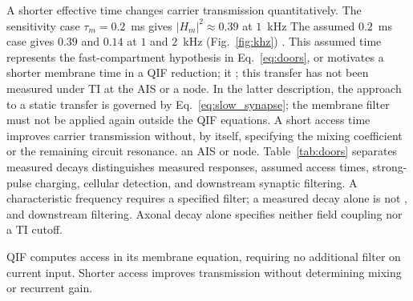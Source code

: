 \documentclass[11pt,a4paper]{article}
\providecommand{\DIFaddtex}[1]{{\protect\color{blue} \sf #1}} %
\providecommand{\DIFdeltex}[1]{{\protect\color{red} \scriptsize #1}} %
\providecommand{\DIFaddbegin}{} %
\providecommand{\DIFaddend}{} %
\providecommand{\DIFdelbegin}{} %
\providecommand{\DIFdelend}{} %
\providecommand{\DIFadd}[1]{\texorpdfstring{\DIFaddtex{#1}}{#1}} %
\providecommand{\DIFdel}[1]{\texorpdfstring{\DIFdeltex{#1}}{}} %
\begin{document}
\DIFdel{A shorter effective time changes carrier transmission quantitatively. The sensitivity
case $\tau_m=0.2$~ms gives $|H_m|^2\approx0.39$ at $1$~kHz }\DIFdelend \DIFaddbegin \DIFadd{The assumed $0.2$~ms case gives $0.39$ }\DIFaddend and $0.14$ at \DIFaddbegin \DIFadd{$1$ and }\DIFaddend $2$~kHz
(Fig.~\ref{fig:khz})\DIFdelbegin \DIFdel{. This assumed time represents the fast-compartment hypothesis
in Eq.~\eqref{eq:doors}, or motivates a shorter membrane time in a QIF reduction; it }\DIFdelend \DIFaddbegin \DIFadd{; this transfer }\DIFaddend has not been measured under TI at \DIFdelbegin \DIFdel{the AIS or a node. In the latter description, the approach to a static transfer is governed by
Eq.~\eqref{eq:slow_synapse}; the membrane filter must not be applied again outside
the QIF equations. A short access time improves carrier transmission without,
by itself, specifying the mixing coefficient or the remaining circuit resonance.
}\DIFdelend \DIFaddbegin \DIFadd{an
AIS or node. }\DIFaddend Table~\ref{tab:doors} \DIFdelbegin \DIFdel{separates measured decays}\DIFdelend \DIFaddbegin \DIFadd{distinguishes measured responses}\DIFaddend ,
assumed access\DIFdelbegin \DIFdel{times, strong-pulse charging, cellular detection, and downstream synaptic filtering. A characteristic frequency requires a specified filter; a measured decay alone is not }\DIFdelend \DIFaddbegin \DIFadd{, and downstream filtering. Axonal decay alone specifies
neither field coupling nor }\DIFaddend a TI cutoff.

\DIFaddbegin \DIFadd{QIF computes access in its membrane equation, requiring no additional filter
on current input. Shorter access improves transmission without determining
mixing or recurrent gain.
}
\end{document}
